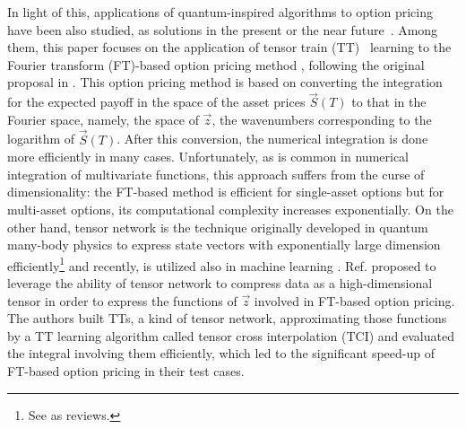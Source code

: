 In light of this, applications of quantum-inspired algorithms to option pricing have been also studied, as solutions in the present or the near future~\cite{doi:10.1137/19M1244172,kastoryano2022highly,patel2022quantuminspired, doi:10.1137/21M1402170}.
Among them, this paper focuses on the application of tensor train (TT)~\cite{Oseledets2011} learning to the Fourier transform (FT)-based option pricing method \cite{carr1999option,lewis2001simple}, following the original proposal in \cite{kastoryano2022highly}.
This option pricing method is based on converting the integration for the expected payoff in the space of the asset prices $\vec{S}(T)$ to that in the Fourier space, namely, the space of $\vec{z}$, the wavenumbers corresponding to the logarithm of $\vec{S}(T)$. 
After this conversion, the numerical integration is done more efficiently in many cases.
Unfortunately, as is common in numerical integration of multivariate functions, this approach suffers from the curse of dimensionality: the FT-based method is efficient for single-asset options but for multi-asset options, its computational complexity increases exponentially.
On the other hand, tensor network is the technique originally developed in quantum many-body physics to express state vectors with exponentially large dimension efficiently\footnote{See \cite{ORUS2014117,Okunishi2022} as reviews.} and recently, is utilized also in machine learning \cite{Stoudenmire2016,novikov2016exponential}.
Ref. \cite{kastoryano2022highly} proposed to leverage the ability of tensor network to compress data as a high-dimensional tensor in order to express the functions of $\vec{z}$ involved in FT-based option pricing.
The authors built TTs, a kind of tensor network, approximating those functions by a TT learning algorithm called tensor cross interpolation (TCI) \cite{Oseledets2010-fg,Dolgov2020-yi, Nunez_Fernandez2022-fo, Ritter2024-pr} and evaluated the integral involving them efficiently, which led to the significant speed-up of FT-based option pricing in their test cases.


